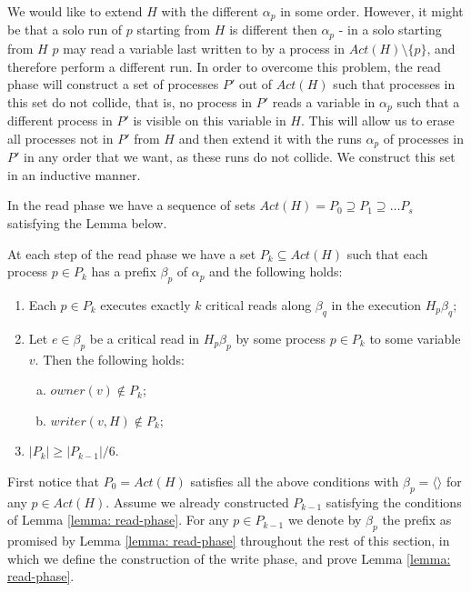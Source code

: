 We would like to extend $H$ with the different $\alpha_p$ in some order. However, it might be that a solo run of $p$ starting from $H$ is different then $\alpha_p$ - in a solo starting from $H$ $p$ may read a variable last written to by a process in $Act(H) \setminus \{p\}$, and therefore perform a different run. In order to overcome this problem, the read phase will construct a set of processes $P'$ out of $Act(H)$ such that processes in this set do not collide, that is, no process in $P'$ reads a variable in $\alpha_p$ such that a different process in $P'$ is visible on this variable in $H$. This will allow us to erase all processes not in $P'$ from $H$ and then extend it with the runs $\alpha_p$ of processes in $P'$ in any order that we want, as these runs do not collide. We construct this set in an inductive manner.

In the read phase we have a sequence of sets $Act(H) = P_0 \supseteq P_1 \supseteq \ldots P_s$ satisfying the Lemma below.

\begin{lemma} \label{lemma: read-phase}
	At each step of the read phase we have a set $P_k \subseteq Act(H)$ such that each process $p \in P_k$ has a prefix $\beta_p$ of $\alpha_p$ and the following holds:
	\begin{enumerate} [(1)]
		\item Each $p \in P_k$ executes exactly $k$ critical reads along $\beta_q$ in the execution $H_p \beta_q$;
		\item Let $e \in \beta_p$ be a critical read in $H_p \beta_p$ by some process $p \in P_k$ to some variable $v$. Then the following holds:
		\begin{enumerate}[(a)]
			\item $owner(v) \notin P_k$;
			\item $writer(v,H) \notin P_k$;
		\end{enumerate}
	\item $|P_k| \geq |P_{k-1}|/6$.
	\end{enumerate}
\end{lemma}

First notice that $P_0=Act(H)$ satisfies all the above conditions with $\beta_p=\langle \rangle$ for any $p \in Act(H)$. Assume we already constructed $P_{k-1}$ satisfying the conditions of Lemma \ref{lemma: read-phase}. For any $p \in P_{k-1}$ we denote by $\beta_p$ the prefix as promised by Lemma \ref{lemma: read-phase} throughout the rest of this section, in which we define the construction of the write phase, and prove Lemma \ref{lemma: read-phase}.


